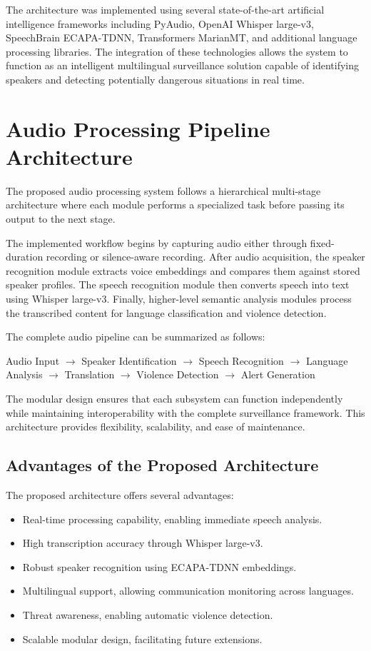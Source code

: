 \documentclass[12pt]{report}
\begin{document}
The architecture was implemented using several state-of-the-art artificial intelligence frameworks including PyAudio, OpenAI Whisper large-v3, SpeechBrain ECAPA-TDNN, Transformers MarianMT, and additional language processing libraries. The integration of these technologies allows the system to function as an intelligent multilingual surveillance solution capable of identifying speakers and detecting potentially dangerous situations in real time.

\section{Audio Processing Pipeline Architecture}

The proposed audio processing system follows a hierarchical multi-stage architecture where each module performs a specialized task before passing its output to the next stage.

The implemented workflow begins by capturing audio either through fixed-duration recording or silence-aware recording. After audio acquisition, the speaker recognition module extracts voice embeddings and compares them against stored speaker profiles. The speech recognition module then converts speech into text using Whisper large-v3. Finally, higher-level semantic analysis modules process the transcribed content for language classification and violence detection.

The complete audio pipeline can be summarized as follows:
\begin{center}
Audio Input $\rightarrow$ Speaker Identification $\rightarrow$ Speech Recognition $\rightarrow$ Language Analysis $\rightarrow$ Translation $\rightarrow$ Violence Detection $\rightarrow$ Alert Generation
\end{center}

The modular design ensures that each subsystem can function independently while maintaining interoperability with the complete surveillance framework. This architecture provides flexibility, scalability, and ease of maintenance.

\subsection{Advantages of the Proposed Architecture}
The proposed architecture offers several advantages:
\begin{itemize}
    \item Real-time processing capability, enabling immediate speech analysis.
    \item High transcription accuracy through Whisper large-v3.
    \item Robust speaker recognition using ECAPA-TDNN embeddings.
    \item Multilingual support, allowing communication monitoring across languages.
    \item Threat awareness, enabling automatic violence detection.
    \item Scalable modular design, facilitating future extensions.
\end{itemize}
\end{document}
